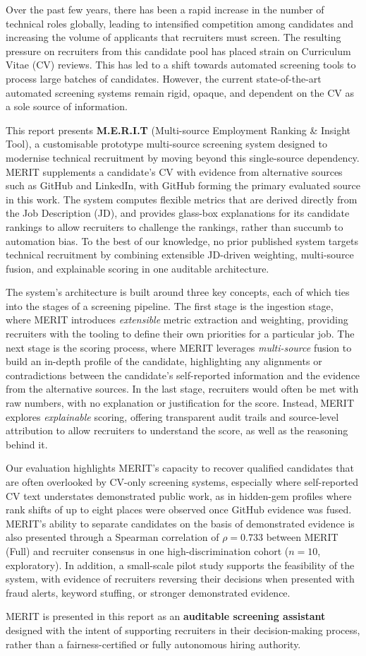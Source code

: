 Over the past few years, there has been a rapid increase in the number of technical roles globally, leading to intensified competition
among candidates and increasing the volume of applicants that recruiters must screen. The resulting pressure on recruiters from this
candidate pool has placed strain on Curriculum Vitae (CV) reviews. This has led to a shift towards automated screening tools to
process large batches of candidates. However, the current state-of-the-art automated screening systems remain rigid, opaque, and dependent
on the CV as a sole source of information.

This report presents \textbf{M.E.R.I.T} (Multi-source Employment Ranking \& Insight Tool), a customisable prototype multi-source
screening system designed to modernise technical recruitment by moving beyond this single-source dependency. MERIT supplements a
candidate's CV with evidence from alternative sources such as GitHub and LinkedIn, with GitHub forming the primary evaluated source in
this work. The system computes flexible metrics that are derived directly from the Job Description (JD), and provides glass-box
explanations for its candidate rankings to allow recruiters to challenge the rankings, rather than succumb to automation bias. To the
best of our knowledge, no prior published system targets technical recruitment by combining extensible JD-driven weighting, multi-source
fusion, and explainable scoring in one auditable architecture.

The system's architecture is built around three key concepts, each of which ties into the stages of a screening pipeline. The first stage
is the ingestion stage, where MERIT introduces \emph{extensible} metric extraction and weighting, providing recruiters with the tooling
to define their own priorities for a particular job. The next stage is the scoring process, where MERIT leverages \emph{multi-source}
fusion to build an in-depth profile of the candidate, highlighting any alignments or contradictions between the candidate's self-reported
information and the evidence from the alternative sources. In the last stage, recruiters would often be met with raw numbers, with no
explanation or justification for the score. Instead, MERIT explores \emph{explainable} scoring, offering transparent audit trails and
source-level attribution to allow recruiters to understand the score, as well as the reasoning behind it.

Our evaluation highlights MERIT's capacity to recover qualified candidates that are often overlooked by CV-only screening systems,
especially where self-reported CV text understates demonstrated public work, as in hidden-gem profiles where rank shifts of up to eight
places were observed once GitHub evidence was fused. MERIT's ability to separate candidates on the basis of demonstrated
evidence is also presented through a Spearman correlation of $\rho = 0.733$ between MERIT (Full) and recruiter consensus in one
high-discrimination cohort ($n = 10$, exploratory). In addition, a small-scale pilot study supports the feasibility of the system, with
evidence of recruiters reversing their decisions when presented with fraud alerts, keyword stuffing, or stronger demonstrated evidence.

MERIT is presented in this report as an \textbf{auditable screening assistant} designed with the intent of supporting recruiters in their
decision-making process, rather than a fairness-certified or fully autonomous hiring authority.
